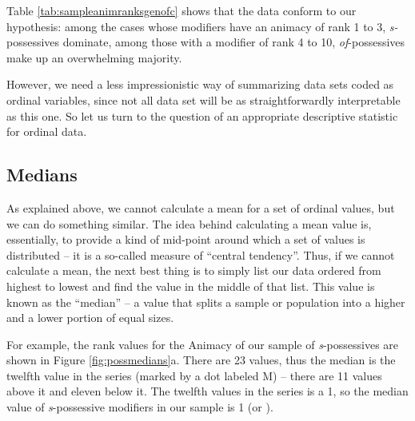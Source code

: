 Table \ref{tab:sampleanimranksgenofc} shows that the data conform to our hypothesis: among the cases whose modifiers have an animacy of rank 1 to 3, \textit{s-}possessives dominate, among those with a modifier of rank 4 to 10, \textit{of}-possessives make up an overwhelming majority.

However, we need a less impressionistic way of summarizing data sets coded as ordinal variables, since not all data set will be as straightforwardly interpretable as this one. So let us turn to the question of an appropriate descriptive statistic for ordinal data.

\subsection{Medians}
\label{sec:medians}

As explained above, we cannot calculate a mean for a set of ordinal values, but we can do something similar. The idea behind calculating a mean value is, essentially, to provide a kind of mid-point around which a set of values is distributed -- it is a so-called measure of ``central tendency''. Thus, if we cannot calculate a mean, the next best thing is to simply list our data ordered from highest to lowest and find the value in the middle of that list. This value is known as the ``median'' -- a value that splits a sample or population into a higher and a lower portion of equal sizes. 

For example, the rank values for the Animacy of our sample of \textit{s}-possessives are shown in Figure \ref{fig:possmedians}a. There are 23 values, thus the median is the twelfth value in the series (marked by a dot labeled M) -- there are 11 values above it and eleven below it. The twelfth values in the series is a 1, so the median value of \textit{s}-possessive modifiers in our sample is 1 (or ).

